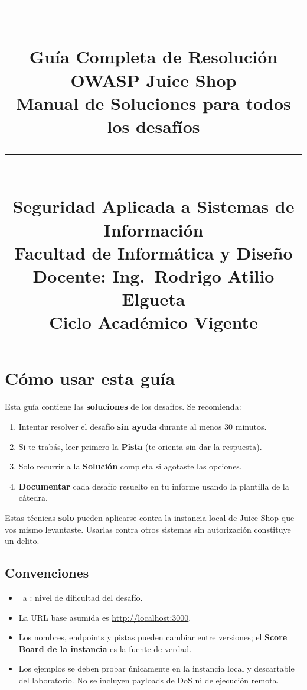\documentclass[11pt,a4paper]{article}
\title{%
  \rule{\textwidth}{1pt}\\[0.3cm]
  \textbf{\Huge \faLock{} Guía Completa de Resolución}\\[0.3cm]
  \textbf{\Large OWASP Juice Shop}\\[0.3cm]
  \large Manual de Soluciones para todos los desafíos\\[0.3cm]
  \rule{\textwidth}{1pt}\\[0.4cm]
  \normalsize Seguridad Aplicada a Sistemas de Información\\
  Facultad de Informática y Diseño\\
  Docente: Ing.\ Rodrigo Atilio Elgueta\\[0.2cm]
  \small Ciclo Académico Vigente
}
\author{}
\date{}
\begin{document}
\maketitle
\thispagestyle{fancy}
\tableofcontents
\newpage

\section{Cómo usar esta guía}

\begin{clave}
Esta guía contiene las \textbf{soluciones} de los desafíos. Se recomienda:
\begin{enumerate}[leftmargin=*]
  \item Intentar resolver el desafío \textbf{sin ayuda} durante al menos 30 minutos.
  \item Si te trabás, leer primero la \textbf{Pista} (te orienta sin dar la respuesta).
  \item Solo recurrir a la \textbf{Solución} completa si agotaste las opciones.
  \item \textbf{Documentar} cada desafío resuelto en tu informe usando la plantilla de la cátedra.
\end{enumerate}
\end{clave}

\begin{alerta}
Estas técnicas \textbf{solo} pueden aplicarse contra la instancia local de Juice Shop que vos mismo levantaste. Usarlas contra otros sistemas sin autorización constituye un delito.
\end{alerta}

\subsection{Convenciones}
\begin{itemize}[leftmargin=*]
  \item \faStar\ a \faStar\faStar\faStar\faStar\faStar: nivel de dificultad del desafío.
  \item La URL base asumida es \url{http://localhost:3000}.
  \item Los nombres, endpoints y pistas pueden cambiar entre versiones; el \textbf{Score Board de la instancia} es la fuente de verdad.
  \item Los ejemplos se deben probar únicamente en la instancia local y descartable del laboratorio. No se incluyen payloads de DoS ni de ejecución remota.
\end{itemize}
\end{document}
